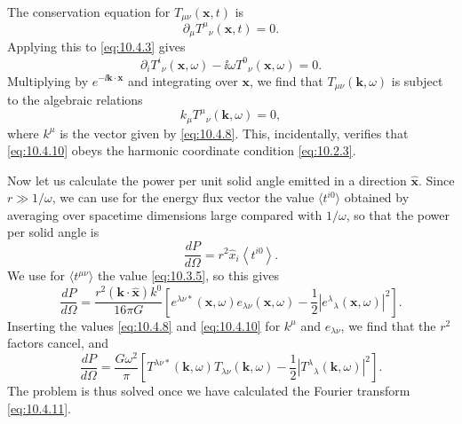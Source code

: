 The conservation equation for \(T_{\mu\nu}(\mathbf{x},t)\) is
\[
  \partial_\mu T^\mu{}_\nu(\mathbf{x},t)=0.
\]
Applying this to \eqref{eq:10.4.3} gives
\[
  \partial_iT^i{}_\nu(\mathbf{x},\omega)
  -\ii\omega T^0{}_\nu(\mathbf{x},\omega)=0.
\]
Multiplying by \(e^{-\ii\mathbf{k}\cdot\mathbf{x}}\) and integrating over
\(\mathbf{x}\), we find that \(T_{\mu\nu}(\mathbf{k},\omega)\) is subject to
the algebraic relations
\begin{equation}
  k_\mu T^\mu{}_\nu(\mathbf{k},\omega)=0,
  \tag{10.4.12}\label{eq:10.4.12}
\end{equation}
where \(k^\mu\) is the vector given by \eqref{eq:10.4.8}. This, incidentally,
verifies that \eqref{eq:10.4.10} obeys the harmonic coordinate condition
\eqref{eq:10.2.3}.

Now let us calculate the power per unit solid angle emitted in a direction
\(\widehat{\mathbf{x}}\). Since \(r\gg1/\omega\), we can use for the energy
flux vector the value \(\langle t^{i0}\rangle\) obtained by averaging over
spacetime dimensions large compared with \(1/\omega\), so that the power per
solid angle is
\[
  \frac{dP}{d\Omega}
  =
  r^2\widehat x_i\left\langle t^{i0}\right\rangle.
\]
We use for \(\langle t^{\mu\nu}\rangle\) the value \eqref{eq:10.3.5}, so
this gives
\[
  \frac{dP}{d\Omega}
  =
  \frac{r^2(\mathbf{k}\cdot\widehat{\mathbf{x}})k^0}{16\pi G}
  \left[
    e^{\lambda\nu*}(\mathbf{x},\omega)e_{\lambda\nu}(\mathbf{x},\omega)
    -\frac12\left|e^\lambda{}_\lambda(\mathbf{x},\omega)\right|^2
  \right].
\]
Inserting the values \eqref{eq:10.4.8} and \eqref{eq:10.4.10} for
\(k^\mu\) and \(e_{\lambda\nu}\), we find that the \(r^2\) factors cancel,
and
\begin{equation}
  \frac{dP}{d\Omega}
  =
  \frac{G\omega^2}{\pi}
  \left[
    T^{\lambda\nu*}(\mathbf{k},\omega)
    T_{\lambda\nu}(\mathbf{k},\omega)
    -\frac12
    \left|T^\lambda{}_\lambda(\mathbf{k},\omega)\right|^2
  \right].
  \tag{10.4.13}\label{eq:10.4.13}
\end{equation}
The problem is thus solved once we have calculated the Fourier transform
\eqref{eq:10.4.11}.


